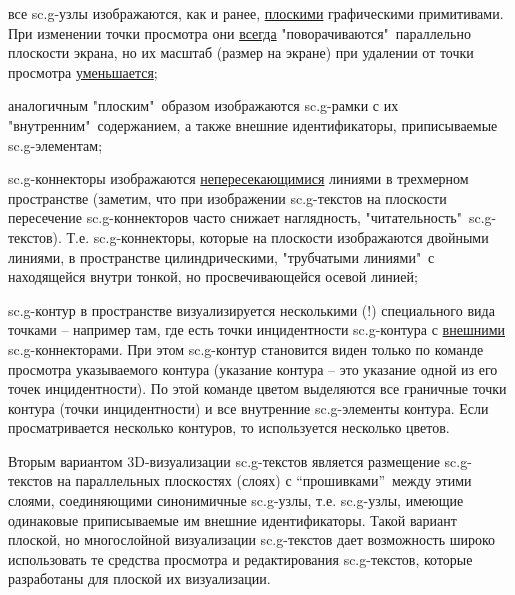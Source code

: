 \begin{SCn}
{\begin{scnitemize}
\item все sc.g-узлы изображаются, как и ранее, \uline{плоскими} графическими примитивами. При изменении точки просмотра они \uline{всегда} "поворачиваются"\ параллельно плоскости экрана, но их масштаб (размер на экране) при удалении от  точки просмотра \uline{уменьшается};
\item аналогичным "плоским"\ образом изображаются sc.g-рамки с их "внутренним"\ содержанием, а также внешние идентификаторы, приписываемые sc.g-элементам;
\item sc.g-коннекторы изображаются \uline{непересекающимися} линиями в трехмерном пространстве (заметим, что при изображении sc.g-текстов на плоскости пересечение sc.g-коннекторов часто снижает наглядность, "читательность"\ sc.g-текстов). Т.е. sc.g-коннекторы, которые на плоскости изображаются двойными линиями, в пространстве  цилиндрическими, "трубчатыми линиями"\ с находящейся внутри тонкой, но просвечивающейся осевой линией;
\item sc.g-контур в пространстве визуализируется несколькими (!) специального вида точками -- например там, где есть точки инцидентности sc.g-контура с \uline{внешними} sc.g-коннекторами. При этом sc.g-контур становится виден только по команде просмотра указываемого контура (указание контура – это указание одной из его точек инцидентности). По этой команде цветом выделяются все граничные точки контура (точки инцидентности) и все внутренние sc.g-элементы контура. Если просматривается  несколько контуров, то используется несколько цветов.
\end{scnitemize}

Вторым вариантом 3D-визуализации sc.g-текстов является размещение sc.g-текстов на параллельных плоскостях (слоях) с “прошивками”\ между этими слоями, соединяющими синонимичные sc.g-узлы, т.е. sc.g-узлы, имеющие одинаковые приписываемые им внешние идентификаторы. Такой вариант плоской, но многослойной визуализации sc.g-текстов дает возможность широко использовать те средства просмотра и редактирования sc.g-текстов, которые разработаны для плоской их визуализации.}

\scnendstruct


\scnstartsubstruct

\end{SCn}
